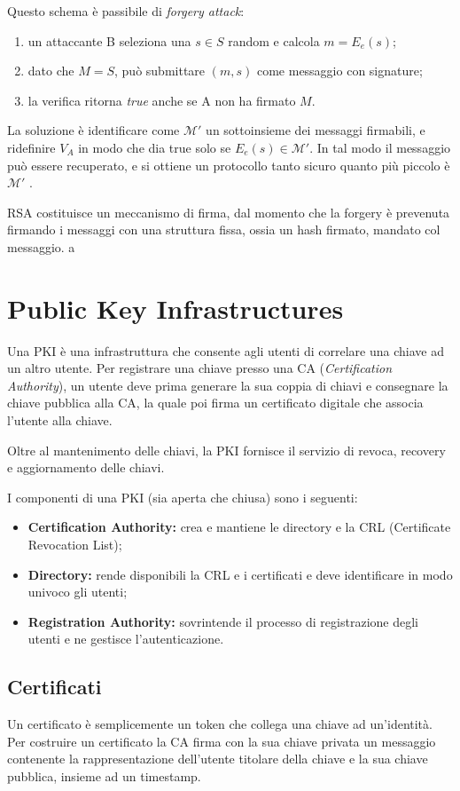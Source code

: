 \documentclass[a4paper, 11pt, twoside]{article}
\begin{document}
	Questo schema è passibile di \textit{forgery attack}:\begin{enumerate}
		\item un attaccante B seleziona una $s \in S$ random e calcola $m = E_e(s)$;
		\item dato che $M=S$, può submittare $(m,s)$ come messaggio con signature;
		\item la verifica ritorna \textit{true} anche se A non ha firmato $M$.
	\end{enumerate}
	
	La soluzione è identificare come $\mathcal{M}'$ un sottoinsieme dei messaggi firmabili, e ridefinire $V_A$ in modo che dia true solo se $E_e(s) \in \mathcal{M}'$. In tal modo il messaggio può essere recuperato, e si ottiene un protocollo tanto sicuro quanto più piccolo è $\mathcal{M}'$ .

	RSA costituisce un meccanismo di firma, dal momento che la forgery è prevenuta firmando i messaggi con una struttura fissa, ossia un hash firmato, mandato col messaggio.
a
	\section{Public Key Infrastructures}
	Una PKI è una infrastruttura che consente agli utenti di correlare una chiave ad un altro utente.
	Per registrare una chiave presso una CA (\textit{Certification Authority}), un utente deve prima generare la sua coppia di chiavi e consegnare la chiave pubblica alla CA, la quale poi firma un certificato digitale che associa l'utente alla chiave.

	Oltre al mantenimento delle chiavi, la PKI fornisce il servizio di revoca, recovery e aggiornamento delle chiavi.

	I componenti di una PKI (sia aperta che chiusa) sono i seguenti: \begin{itemize}
			\item \textbf{Certification Authority:} crea e mantiene le directory e la CRL (Certificate Revocation List);
			\item \textbf{Directory:} rende disponibili la CRL e i certificati e deve identificare in modo univoco gli utenti;
			\item \textbf{Registration Authority:} sovrintende il processo di registrazione degli utenti e ne gestisce l'autenticazione.
	\end{itemize}

    \subsection{Certificati}
    Un certificato è semplicemente un token che collega una chiave ad un'identità. Per costruire un certificato la CA firma con la sua chiave privata un messaggio contenente la rappresentazione dell'utente titolare della chiave e la sua chiave pubblica, insieme ad un timestamp.
\end{document}

